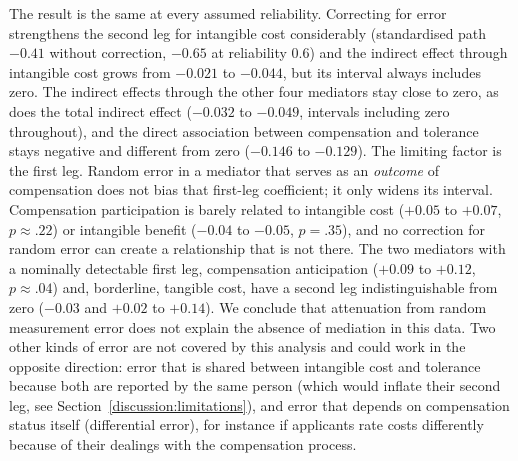 The result is the same at every assumed reliability. Correcting for error
strengthens the second leg for intangible cost considerably (standardised
path $-0.41$ without correction, $-0.65$ at reliability 0.6) and the
indirect effect through intangible cost grows from $-0.021$ to $-0.044$, but
its interval always includes zero. The indirect effects through the other four
mediators stay close to zero, as does the total indirect effect
($-0.032$ to $-0.049$, intervals including zero throughout), and the direct
association between compensation and tolerance stays negative and different from
zero ($-0.146$ to $-0.129$). The limiting factor is the first leg. Random
error in a mediator that serves as an \emph{outcome} of compensation does not
bias that first-leg coefficient; it only widens its interval. Compensation
participation is barely related to intangible cost ($+0.05$ to $+0.07$,
$p \approx .22$) or intangible benefit ($-0.04$ to $-0.05$, $p = .35$), and
no correction for random error can create a relationship that is not there.
The two mediators with a nominally detectable first leg, compensation anticipation
($+0.09$ to $+0.12$, $p \approx .04$) and, borderline, tangible cost, have a
second leg indistinguishable from zero ($-0.03$ and $+0.02$ to $+0.14$).
We conclude that attenuation from random measurement error does not explain
the absence of mediation in this data. Two other kinds of error are not
covered by this analysis and could work in the opposite direction: error that is
shared between intangible cost and tolerance because both are reported by the
same person (which would inflate their second leg, see
Section~\ref{discussion:limitations}), and error that depends on compensation
status itself (differential error), for instance if applicants rate costs
differently because of their dealings with the compensation process.


